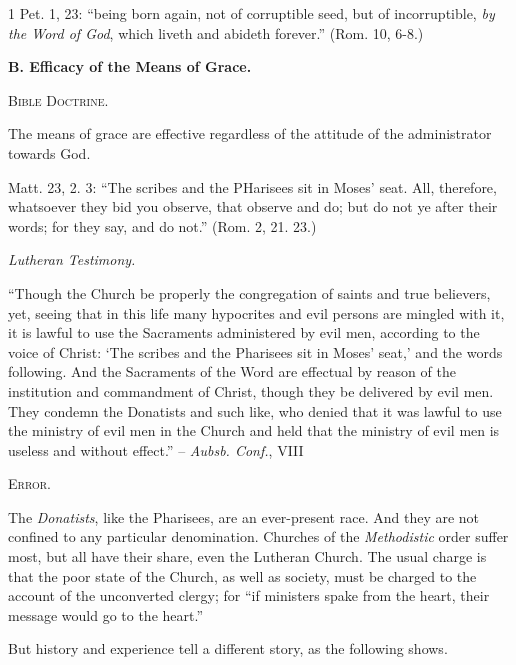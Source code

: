 \documentclass[
]{book}
\begin{document}
1 Pet. 1, 23: ``being born again, not of corruptible seed, but of incorruptible, \emph{by the Word of God}, which liveth and abideth forever.'' (Rom. 10, 6-8.)

\begin{center}
\textbf{B.  Efficacy of the Means of Grace.}

\textsc{Bible Doctrine.}
\end{center}

The means of grace are effective regardless of the attitude of the administrator towards God.

Matt. 23, 2. 3: ``The scribes and the PHarisees sit in Moses' seat. All, therefore, whatsoever they bid you observe, that observe and do; but do not ye after their words; for they say, and do not.'' (Rom. 2, 21. 23.)

\begin{center}
\textsl{Lutheran Testimony.}
\end{center}

``Though the Church be properly the congregation of saints and true believers, yet, seeing that in this life many hypocrites and evil persons are mingled with it, it is lawful to use the Sacraments administered by evil men, according to the voice of Christ: `The scribes and the Pharisees sit in Moses' seat,' and the words following. And the Sacraments of the Word are effectual by reason of the institution and commandment of Christ, though they be delivered by evil men. They condemn the Donatists and such like, who denied that it was lawful to use the ministry of evil men in the Church and held that the ministry of evil men is useless and without effect.'' -- \emph{Aubsb. Conf.}, VIII

\begin{center}
\textsc{Error.}
\end{center}

The \emph{Donatists}, like the Pharisees, are an ever-present race. And they are not confined to any particular denomination. Churches of the \emph{Methodistic} order suffer most, but all have their share, even the Lutheran Church. The usual charge is that the poor state of the Church, as well as society, must be charged to the account of the unconverted clergy; for ``if ministers spake from the heart, their message would go to the heart.''

But history and experience tell a different story, as the following shows.
\end{document}
